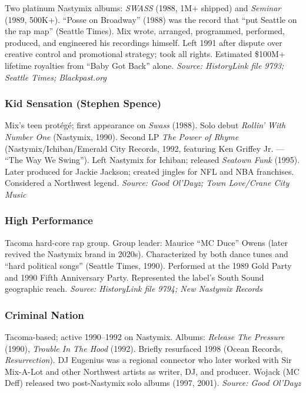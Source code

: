 \documentclass[11pt,letterpaper]{article}
\begin{document}
Two platinum Nastymix albums: \textit{SWASS} (1988, 1M+ shipped) and \textit{Seminar} (1989, 500K+).
``Posse on Broadway'' (1988) was the record that ``put Seattle on the rap map'' (Seattle Times). Mix
wrote, arranged, programmed, performed, produced, and engineered his recordings himself. Left 1991
after dispute over creative control and promotional strategy; took all rights. Estimated \$100M+ lifetime
royalties from ``Baby Got Back'' alone. \textit{Source: HistoryLink file 9793; Seattle Times; Blackpast.org}

\subsubsection{Kid Sensation (Stephen Spence)}

Mix's teen prot\'eg\'e; first appearance on \textit{Swass} (1988). Solo debut \textit{Rollin' With Number One}
(Nastymix, 1990). Second LP \textit{The Power of Rhyme} (Nastymix/Ichiban/Emerald City Records, 1992,
featuring Ken Griffey Jr. --- ``The Way We Swing''). Left Nastymix for Ichiban; released \textit{Seatown Funk}
(1995). Later produced for Jackie Jackson; created jingles for NFL and NBA franchises. Considered a
Northwest legend. \textit{Source: Good Ol'Dayz; Town Love/Crane City Music}

\subsubsection{High Performance}

Tacoma hard-core rap group. Group leader: Maurice ``MC Duce'' Owens (later revived the Nastymix
brand in 2020s). Characterized by both dance tunes and ``hard political songs'' (Seattle Times, 1990).
Performed at the 1989 Gold Party and 1990 Fifth Anniversary Party. Represented the label's South
Sound geographic reach. \textit{Source: HistoryLink file 9794; New Nastymix Records}

\subsubsection{Criminal Nation}

Tacoma-based; active 1990--1992 on Nastymix. Albums: \textit{Release The Pressure} (1990),
\textit{Trouble In The Hood} (1992). Briefly resurfaced 1998 (Ocean Records, \textit{Resurrection}).
DJ Eugenius was a regional connector who later worked with Sir Mix-A-Lot and other Northwest artists
as writer, DJ, and producer. Wojack (MC Deff) released two post-Nastymix solo albums (1997, 2001).
\textit{Source: Good Ol'Dayz}
\end{document}
